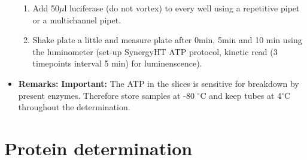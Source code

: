 \documentclass{EU-report}
\begin{document}
\begin{itemize}
\begin{enumerate}
\item Add 50$\mu$l luciferase (do not vortex) to every well using a repetitive pipet or a multichannel pipet.
\item Shake plate a little and measure plate after 0min, 5min and 10 min using the luminometer (set-up SynergyHT ATP protocol, kinetic read (3 timepoints interval 5 min) for luminenscence).
\end{enumerate}
\item \textbf{Remarks:} \textbf{Important:} The ATP in the slices is sensitive for breakdown by present enzymes. Therefore store samples at -80 $^{\circ}$C and keep tubes at 4$^{\circ}$C throughout the determination.
\end{itemize}

\section{Protein determination}
\label{protein}
\end{document}

